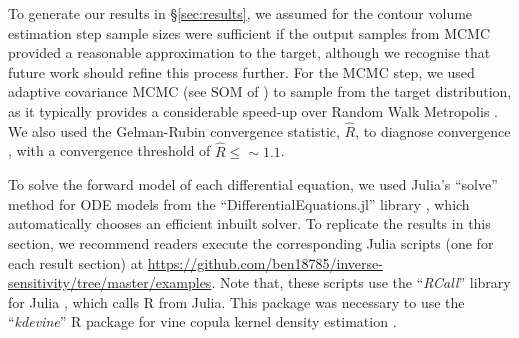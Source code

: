 To generate our results in \S\ref{sec:results}, we assumed for the contour volume estimation step sample sizes were sufficient if the output samples from MCMC provided a reasonable approximation to the target, although we recognise that future work should refine this process further. For the MCMC step, we used adaptive covariance MCMC (see SOM of \cite{johnstone2016uncertainty}) to sample from the target distribution, as it typically provides a considerable speed-up over Random Walk Metropolis \cite{metropolis1953equation,lambert2018Student}. We also used the Gelman-Rubin convergence statistic, $\hat{R}$, to diagnose convergence \cite{lambert2018Student,gelman1992inference}, with a convergence threshold of $\hat{R}\leq\sim 1.1$.

To solve the forward model of each differential equation, we used Julia's \cite{bezanson2017julia} ``solve'' method for ODE models from the ``DifferentialEquations.jl'' library \cite{rackauckas2017differentialequations}, which automatically chooses an efficient inbuilt solver. To replicate the results in this section, we recommend readers execute the corresponding Julia scripts (one for each result section) at \url{https://github.com/ben18785/inverse-sensitivity/tree/master/examples}. Note that, these scripts use the ``\textit{RCall}'' library for Julia \cite{batesRCall}, which calls \textsf{R} from Julia. This package was necessary to use the ``\textit{kdevine}'' \textsf{R} package for vine copula kernel density estimation \cite{naglerkdevine2018}.
